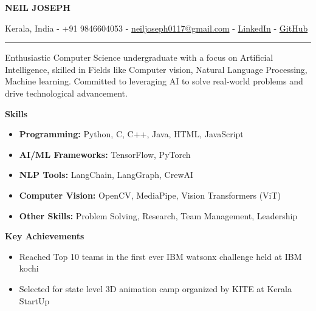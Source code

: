 \documentclass{article}
\newcommand{\resumesection}[1]{
  \vspace{10pt}
  {\RaggedRight\Large\textbf{#1}}
  \par\vspace{5pt}
}
\begin{document}
\begin{center}
  {\Huge\textbf{NEIL JOSEPH}}

  \vspace{5pt}
  {\normalsize Kerala, India - +91 9846604053 - \href{mailto:neiljoseph0117@gmail.com}{neiljoseph0117@gmail.com} - \href{https://www.linkedin.com/in/neil-joseph-79b74025b}{LinkedIn} - \href{https://github.com/neiljoseph01}{GitHub}}

  \vspace{10pt}
  \rule{\textwidth}{0.4pt}
  \vspace{10pt}
\end{center}

\justifying
Enthusiastic Computer Science undergraduate with a focus on Artificial Intelligence, skilled in Fields like Computer vision, Natural Language Processing, Machine learning. Committed to leveraging AI to solve real-world problems and drive technological advancement.

\resumesection{Skills}
\begin{itemize}[leftmargin=*,noitemsep,topsep=0pt,partopsep=0pt]
  \item \textbf{Programming:} Python, C, C++, Java, HTML, JavaScript
  \item \textbf{AI/ML Frameworks:} TensorFlow, PyTorch
  \item \textbf{NLP Tools:} LangChain, LangGraph, CrewAI
  \item \textbf{Computer Vision:} OpenCV, MediaPipe, Vision Transformers (ViT)
  \item \textbf{Other Skills:} Problem Solving, Research, Team Management, Leadership
\end{itemize}

\resumesection{Key Achievements}
\begin{itemize}[leftmargin=*,noitemsep,topsep=0pt,partopsep=0pt]
  \item Reached Top 10 teams in the first ever IBM watsonx challenge held at IBM kochi
  \item Selected for state level 3D animation camp organized by KITE at Kerala StartUp
\end{itemize}
\end{document}

